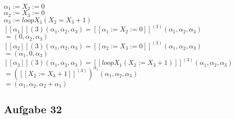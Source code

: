\documentclass[11pt]{amsart}
\begin{document}
  $\alpha_1 := X_2 := 0$ \\
  $\alpha_2 := X_3 := 0$ \\
  $\alpha_3 := loop X_1(X_2 = X_3 + 1)$ \\
  $[[\alpha_1]]{(3)}(\alpha_1,\alpha_2,\alpha_3) = [[\alpha_1 := X_2 := 0]]^{(3)}(\alpha_1,\alpha_2,\alpha_3)$ \\
  $    = (0,\alpha_2,\alpha_3)$ \\[0.3cm]
  
  $[[\alpha_2]]{(3)}(\alpha_1,\alpha_2,\alpha_3) = [[\alpha_2 := X_3 := 0]]^{(3)}(\alpha_1,\alpha_2,\alpha_3)$ \\
  $    = (\alpha_1,0,\alpha_3)$ \\[0.3cm]
  
  $[[\alpha_3]]{(3)}(\alpha_1,\alpha_2,\alpha_3) = [[loop X_1(X_2 := X_3 + 1)]]^{(3)}(\alpha_1,\alpha_2,\alpha_3)$ \\
  $    = ([[X_2 := X_3 + 1]]^{(3)})^{\alpha_1}(\alpha_1,\alpha_2,\alpha_3)$ \\
  $    = (\alpha_1, \alpha_2 , \alpha_2 + \alpha_1) $ \\[0.5cm]

\subsection{Aufgabe 32}
\end{document}
